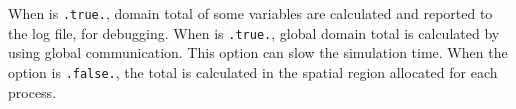 
\noindent
When  is \verb|.true.|, domain total of some variables are calculated and reported to the log file, for debugging.
%
When  is \verb|.true.|, global domain total is calculated by using global communication.
This option can slow the simulation time.
When the option is \verb|.false.|, the total is calculated in the spatial region allocated for each process.



